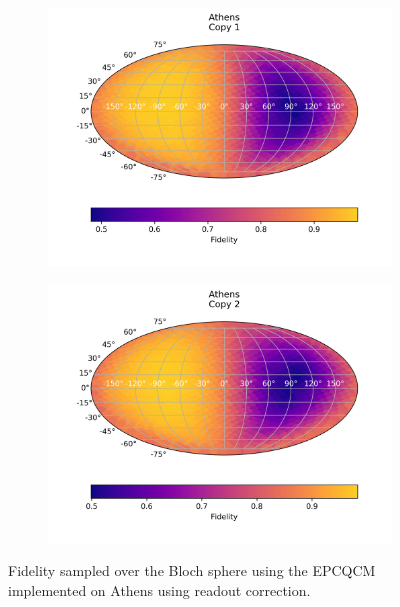   \begin{figure}[H]
    \centering
    \begin{subfigure}{.5\textwidth}
      \centering
      \includegraphics[width=\textwidth]{Figures/Economical/IBM/FullSphere/results_athens_copy1.png}
      \label{fig:epc_uncorrected_athens_sphere_1}
    \end{subfigure}%
    \begin{subfigure}{.5\textwidth}
      \centering
      \includegraphics[width=\textwidth]{Figures/Economical/IBM/FullSphere/results_athens_copy2.png}
      \label{fig:epc_uncorrected_athens_sphere_2}
    \end{subfigure}
    \caption{Fidelity sampled over the Bloch sphere using the EPCQCM implemented on Athens using readout correction.}
    \label{fig:epc_uncorrected_athens_sphere}
  \end{figure}
  
